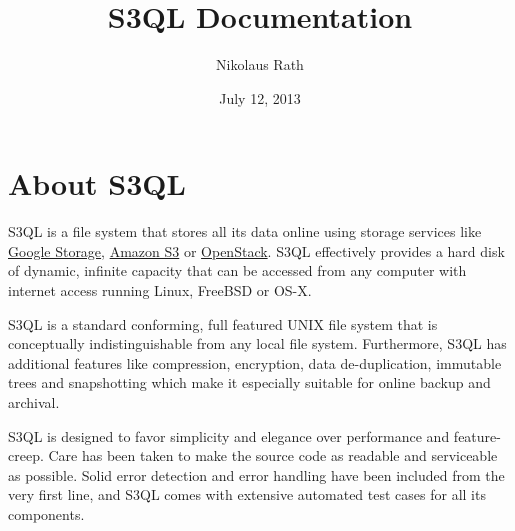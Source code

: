 \documentclass[letterpaper,10pt,english]{sphinxmanual}
\title{S3QL Documentation}
\date{July 12, 2013}
\author{Nikolaus Rath}
\begin{document}
\maketitle
\tableofcontents
{}\label{index::doc}



\chapter{About S3QL}
\label{about:about-s3ql}\label{about::doc}\label{about:s3ql-user-s-guide}
S3QL is a file system that stores all its data online using storage
services like \href{http://code.google.com/apis/storage/}{Google Storage}, \href{http://aws.amazon.com/s3AmazonS3}{Amazon S3} or \href{http://openstack.org/projects/storage/}{OpenStack}. S3QL effectively provides
a hard disk of dynamic, infinite capacity that can be accessed from
any computer with internet access running Linux, FreeBSD or OS-X.

S3QL is a standard conforming, full featured UNIX file system that is
conceptually indistinguishable from any local file system.
Furthermore, S3QL has additional features like compression,
encryption, data de-duplication, immutable trees and snapshotting
which make it especially suitable for online backup and archival.

S3QL is designed to favor simplicity and elegance over performance and
feature-creep. Care has been taken to make the source code as
readable and serviceable as possible. Solid error detection and error
handling have been included from the very first line, and S3QL comes
with extensive automated test cases for all its components.
\end{document}
